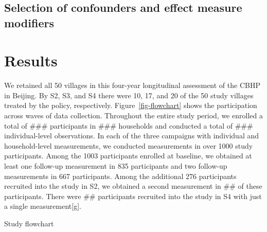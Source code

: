 \documentclass[
  letterpaper,
  DIV=11,
  numbers=noendperiod]{scrartcl}
\begin{document}
\hypertarget{selection-of-confounders-and-effect-measure-modifiers}{%
\subsection{Selection of confounders and effect measure
modifiers}\label{selection-of-confounders-and-effect-measure-modifiers}}

\hypertarget{results-1}{%
\section{Results}\label{results-1}}

We retained all 50 villages in this four-year longitudinal assessment of
the CBHP in Beijing. By S2, S3, and S4 there were 10, 17, and 20 of the
50 study villages treated by the policy, respectively.
Figure~\ref{fig-flowchart} shows the participation across waves of data
collection. Throughout the entire study period, we enrolled a total of
\#\#\# participants in \#\#\# households and conducted a total of \#\#\#
individual-level observations. In each of the three campaigns with
individual and household-level measurements, we conducted measurements
in over 1000 study participants. Among the 1003 participants enrolled at
baseline, we obtained at least one follow-up measurement in 835
participants and two follow-up measurements in 667 participants. Among
the additional 276 participants recruited into the study in S2, we
obtained a second measurement in \#\# of these participants. There were
\#\# participants recruited into the study in S4 with just a single
measurement{[}g{]}.

Study flowchart
\end{document}

